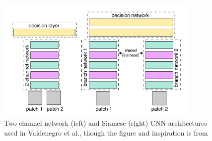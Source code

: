 \begin{figure}[ht]
\centering
\includegraphics[height=6cm]{images/densenet/two_channel_only_siamese.png}
\caption{Two channel network (left) and Siamese (right) CNN architectures used in Valdenegro et al., though the figure and inspiration is from \cite{zagoruyko2015learning}}
\label{fig:two_channel_only_siamese}
\end{figure}
